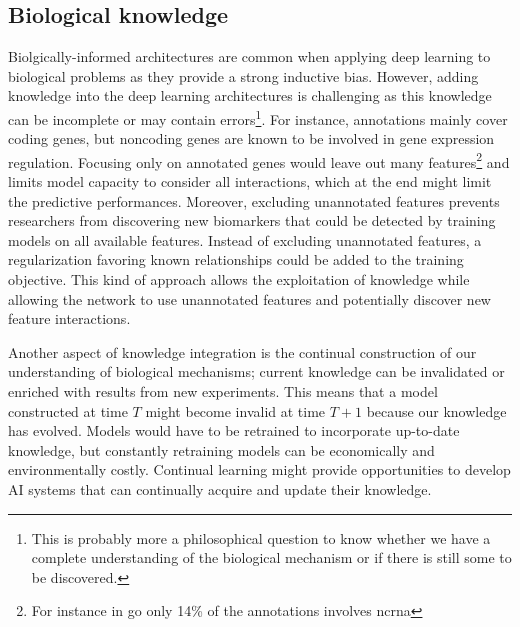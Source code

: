 \documentclass[../main.tex]{subfiles}
\begin{document}
	\subsection{Biological knowledge}\label{sec:persp_knwoledged}
		Biolgically-informed architectures are common when applying deep learning to biological problems as they provide a strong inductive bias.
		However, adding knowledge into the deep learning architectures is challenging as this knowledge can be incomplete or may contain errors\footnote{This is probably more a philosophical question to know whether we have a complete understanding of the biological mechanism or if there is still some to be discovered.}.
		For instance, annotations mainly cover coding genes, but noncoding genes are known to be involved in gene expression regulation.
		Focusing only on annotated genes would leave out many features\footnote{For instance in \gls{go} only 14\% of the annotations involves \gls{ncrna}} and limits model capacity to consider all interactions, which at the end might limit the predictive performances.
		Moreover, excluding unannotated features prevents researchers from discovering new biomarkers that could be detected by training models on all available features.
		Instead of excluding unannotated features, a regularization favoring known relationships could be added to the training objective.
		This kind of approach allows the exploitation of knowledge while allowing the network to use unannotated features and potentially discover new feature interactions.

		Another aspect of knowledge integration is the continual construction of our understanding of biological mechanisms; current knowledge can be invalidated or enriched with results from new experiments.
		This means that a model constructed at time \(T\) might become invalid at time \(T+1\) because our knowledge has evolved.
		Models would have to be retrained to incorporate up-to-date knowledge, but constantly retraining models can be economically and environmentally costly.
		Continual learning might provide opportunities to develop AI systems that can continually acquire and update their knowledge\cite{wang2024comprehensivesurveycontinuallearning}.
\end{document}
